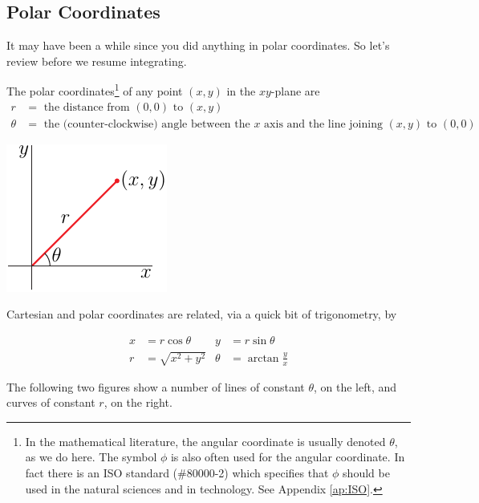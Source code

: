 \subsection{Polar Coordinates} \label{sec polar coords}
It may have been a while since you did anything in polar coordinates.
So let's review before we resume integrating.
\begin{defn}\label{def polars}
The polar coordinates\footnote{In the mathematical literature,
the angular coordinate is usually denoted $\theta$, as we do here.
The symbol $\phi$ is also often used for the angular coordinate.
In fact there is an ISO standard (\#80000-2) which specifies 
that $\phi$ should be used in the natural sciences and in technology.
See Appendix \ref{ap:ISO}.} 
of any point $(x,y)$ in the $xy$-plane are
\begin{align*}
r&=\text{ the distance from }(0,0)\text{ to }(x,y)\\
\theta&=\text{ the (counter-clockwise) angle between the $x$ axis 
               and the line joining $(x,y)$ to $(0,0)$}
\end{align*}
\begin{efig}
\begin{center}
    \includegraphics{polar.pdf}
\end{center}
\end{efig}
\end{defn}
Cartesian and polar coordinates are related, via a quick bit
of trigonometry, by
\begin{impeqn}\label{eqn polars}
\begin{align*}
x&=r\cos\theta &
y&=r\sin\theta  \\
    r&=\sqrt{x^2+y^2} &
    \theta&=\arctan\frac{y}{x}
\end{align*}
\end{impeqn}
The following two figures show a number of lines of constant $\theta$,
on the left, and curves of constant $r$, on the right.
